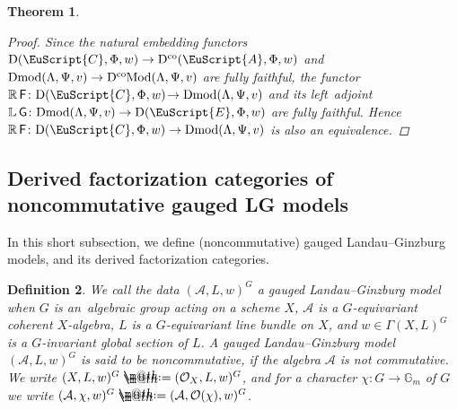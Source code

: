 \documentclass[10pt,a4paper]{amsart}
\makeatletter
\newtheorem{dfn}{Definition}[section]
\newtheorem{thm}[dfn]{Theorem}
\newcommand*{\defeq}{\mathrel{\rlap{%
 \raisebox{0.3ex}{$\m@th\cdot$}}%
 \raisebox{-0.3ex}{$\m@th\cdot$}}%
 =}
\numberwithin{equation}{section}
\newcommand{\Dmod}{\operatorname{Dmod}}
\newcommand{\DcoMod}{\operatorname{D^{co}\hspace{-0.1mm}Mod}}
\newcommand{\Dco}{\operatorname{D^{co}}}
\newcommand{\D}{\operatorname{D}}
\newcommand{\cA}{\mathcal{A}}
\newcommand{\cO}{\mathcal{O}}
\newcommand{\bG}{\mathbb{G}}
\newcommand{\bL}{\mathbb{L}}
\newcommand{\bR}{\mathbb{R}}
\newcommand{\scrA}{\EuScript{A}}
\newcommand{\scrC}{\EuScript{C}}
\newcommand{\scrE}{\EuScript{E}}
\newcommand{\F}{\operatorname{\sf{F}}}
\newcommand{\G}{\operatorname{\sf{G}}}
\makeatother
\begin{document}
\begin{thm}
\begin{proof}
Since the natural embedding functors $\D(\scrC,\Phi,w)\to \Dco(\scrA,\Phi,w)$ and $\Dmod(\Lambda,\Psi,v)\to \DcoMod(\Lambda,\Psi,v)$ are fully faithful, the functor $\bR \F\colon\!\D(\scrC,\Phi,w)\!\to \Dmod(\Lambda,\Psi,v)$ and its left~adjo\-int $\bL \G\colon \! \Dmod(\Lambda,\Psi,v)\to \D(\scrE,\Phi,w)$ are fully faithful. Hence $\bR \F\colon\!\D(\scrC,\Phi,w)\to
\Dmod(\Lambda,\Psi,v)$ is also an equivalence.
\end{proof}
\end{thm}

\subsection{Derived factorization categories of noncommutative gauged LG models}

In this short subsection, we define (noncommutative) gauged Landau--Ginzburg models, and its derived factorization categories.

\begin{dfn}
We call the data $(\cA,L,w)^G$ a {\it gauged Landau--Ginzburg model} when $G$ is an~alge\-braic group acting on a scheme $X$, $\cA$ is a $G$-equivariant coherent $X$-algebra, $L$ is a $G$-equivariant line bundle on $X$, and $w\in \Gamma(X,L)^G$ is a $G$-invariant global section of $L$. A gauged Landau--Ginzburg model $(\cA,L,w)^G$ is said to be {\it noncommutative}, if the algebra $\cA$ is not commutative. We write $(X,L,w)^G\defeq(\cO_X,L,w)^G$, and for a character $\chi\colon G\to \bG_m$ of $G$ we write $(\cA,\chi,w)^G\defeq(\cA,\cO(\chi),w)^G$.
\end{dfn}
\end{document}
